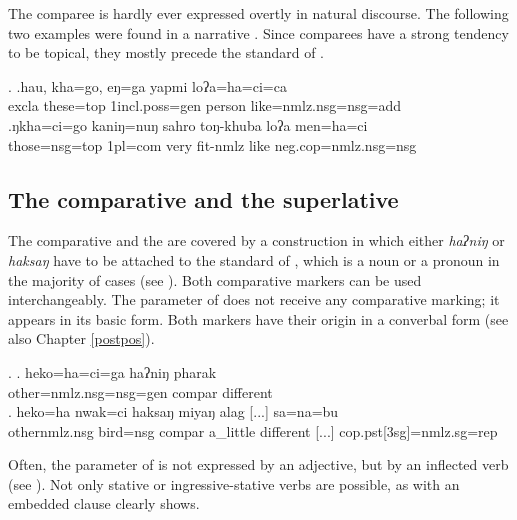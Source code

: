  The comparee is hardly ever expressed overtly in natural discourse. The following two examples were found in a narrative \Next.  Since comparees have a strong tendency to be  topical, they mostly precede the standard of .

\ex. \ag.hau,  kha=go,      eŋ=ga              yapmi  loʔa=ha=ci=ca\\
{\sc excla} these{\sc =top} {\sc 1incl.poss=gen} person like{\sc =nmlz.nsg=nsg=add}\\
 
\bg.ŋkha=ci=go  kaniŋ=nuŋ   sahro toŋ-khuba   loʔa men=ha=ci\\
  those{\sc =nsg=top} {\sc 1pl=com} very fit-{\sc nmlz} like {\sc neg.cop=nmlz.nsg=nsg}\\
   


\subsection{The comparative and the superlative}

The comparative and the  are covered by a construction in which either \emph{haʔniŋ} or \emph{haksaŋ} have to be attached to the standard of , which is a noun or a pronoun in the majority of cases (see \Next). Both comparative markers can be used interchangeably. The parameter of  does not receive any comparative marking; it appears in its basic form. Both markers have their origin in a converbal form (see also Chapter \ref{postpos}).

\ex. \ag. heko=ha=ci=ga haʔniŋ  pharak \\
other{\sc =nmlz.nsg=nsg=gen} {\sc compar} different\\
\bg. heko=ha nwak=ci haksaŋ miyaŋ alag [...] sa=na=bu\\
	other{\sc nmlz.nsg} bird{\sc =nsg} {\sc compar}  a\_little different [...] {\sc cop.pst[3sg]=nmlz.sg=rep}\\
	 
	
Often, the parameter of  is not expressed by an adjective, but by an inflected verb (see \Next). Not only stative or ingressive-stative verbs are possible, as \Next[b] with an embedded clause clearly shows.


